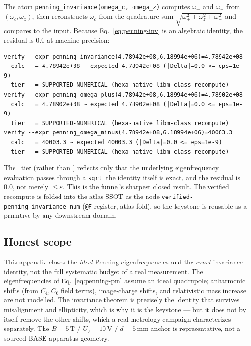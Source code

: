 The atom \verb|penning_invariance(omega_c, omega_z)| computes $\omega_+$ and
$\omega_-$ from $(\omega_c,\omega_z)$, then reconstructs $\omega_c$ from the
quadrature sum $\sqrt{\omega_+^2+\omega_z^2+\omega_-^2}$ and compares to the
input. Because Eq.~\eqref{eq:penning-inv} is an algebraic identity, the
residual is $0.0$ at machine precision:
\begin{lstlisting}
verify --expr penning_invariance(4.78942e+08,6.18994e+06)=4.78942e+08
  calc   = 4.78942e+08 ~ expected 4.78942e+08 (|Delta|=0.0 <= eps=1e-9)
  tier   = SUPPORTED-NUMERICAL (hexa-native libm-class recompute)
verify --expr penning_omega_plus(4.78942e+08,6.18994e+06)=4.78902e+08
  calc   = 4.78902e+08 ~ expected 4.78902e+08 (|Delta|=0.0 <= eps=1e-9)
  tier   = SUPPORTED-NUMERICAL (hexa-native libm-class recompute)
verify --expr penning_omega_minus(4.78942e+08,6.18994e+06)=40003.3
  calc   = 40003.3 ~ expected 40003.3 (|Delta|=0.0 <= eps=1e-9)
  tier   = SUPPORTED-NUMERICAL (hexa-native libm-class recompute)
\end{lstlisting}
The \tierGreen\ tier (rather than \tierBlue) reflects only that the
underlying eigenfrequency evaluation passes through a \texttt{sqrt}; the
identity itself is exact, and the residual is $0.0$, not merely
$\le\varepsilon$. This is the funnel's sharpest closed result. The verified
recompute is folded into the atlas SSOT as the node
\verb|verified-penning_invariance-num| (\texttt{@F} register, atlas-fold),
so the keystone is reusable as a primitive by any downstream domain.

\subsection{Honest scope}
\label{app:penning-scope}

This appendix closes the \emph{ideal} Penning eigenfrequencies and the
\emph{exact} invariance identity, not the full systematic budget of a real
measurement. The eigenfrequencies of Eq.~\eqref{eq:penning-pm} assume an
ideal quadrupole; anharmonic shifts (from $C_4,C_6$ field terms), image-charge
shifts, and relativistic mass increase are not modelled. The invariance
theorem is precisely the identity that survives misalignment and ellipticity,
which is why it is the keystone --- but it does not by itself remove the other
shifts, which a real metrology campaign characterizes separately. The
$B=5$\,T / $U_0=10$\,V / $d=5$\,mm anchor is representative, not a sourced
BASE apparatus geometry.
